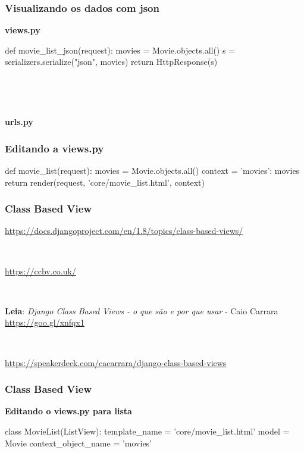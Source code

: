 \documentclass[aspectratio=169]{beamer}
\begin{document}
\begin{frame}[fragile]\frametitle{Visualizando os dados com json}

\textbf{views.py}

\begin{pythoncode}
def movie_list_json(request):
    movies = Movie.objects.all()
    s = serializers.serialize("json", movies)
    return HttpResponse(s)
\end{pythoncode}

\

\

\textbf{urls.py}


\end{frame}




\begin{frame}[fragile]\frametitle{Editando a views.py}

\begin{pythoncode}
def movie_list(request):
    movies = Movie.objects.all()
    context = {'movies': movies}
    return render(request, 'core/movie_list.html', context)
\end{pythoncode}

\end{frame}


\begin{frame}[fragile]\frametitle{Class Based View}

\url{https://docs.djangoproject.com/en/1.8/topics/class-based-views/}

\

\url{https://ccbv.co.uk/}

\

\textbf{Leia}: \emph{Django Class Based Views - o que s\~ao e por que usar} - Caio Carrara \url{https://goo.gl/xnfqx1}

\

\url{https://speakerdeck.com/cacarrara/django-class-based-views}

\end{frame}


\begin{frame}[fragile]\frametitle{Class Based View}

\textbf{Editando o views.py para lista}

\begin{pythoncode}
class MovieList(ListView):
    template_name = 'core/movie_list.html'
    model = Movie
    context_object_name = 'movies'
\end{pythoncode}


\end{frame}
\end{document}

